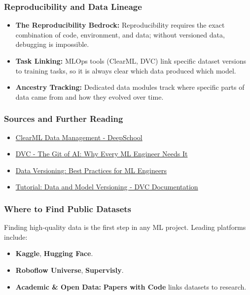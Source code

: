 \documentclass[aspectratio=169]{beamer}
\begin{document}
\begin{frame}[t]
    \frametitle{Reproducibility and Data Lineage}
    \begin{itemize}
        \item \textbf{The Reproducibility Bedrock:} Reproducibility requires the exact combination of code, environment, and data; without versioned data, debugging is impossible.
        \item \textbf{Task Linking:} MLOps tools (ClearML, DVC) link specific dataset versions to training tasks, so it is always clear which data produced which model.
        \item \textbf{Ancestry Tracking:} Dedicated data modules track where specific parts of data came from and how they evolved over time.
    \end{itemize}
\end{frame}

\begin{frame}[t]
    \frametitle{Sources and Further Reading}
    \begin{itemize}
        \item \href{https://blog.deepschool.ru/data/clearml-data-management/}{ClearML Data Management - DeepSchool}
        \item \href{https://aws.plainenglish.io/dvc-the-git-of-ai-why-every-ml-engineer-needs-it-fee2f81f1559}{DVC - The Git of AI: Why Every ML Engineer Needs It}
        \item \href{https://labelyourdata.com/articles/data-versioning-best-practices}{Data Versioning: Best Practices for ML Engineers}
        \item \href{https://dvc.org/doc/use-cases/versioning-data-and-models}{Tutorial: Data and Model Versioning - DVC Documentation}
    \end{itemize}
\end{frame}

\begin{frame}[t]
    \frametitle{Where to Find Public Datasets}
    Finding high-quality data is the first step in any ML project. Leading platforms include:
    \begin{itemize}
        \item \textbf{Kaggle}, \textbf{Hugging Face}.
        \item \textbf{Roboflow Universe}, \textbf{Supervisly}.
        \item \textbf{Academic \& Open Data:} \textbf{Papers with Code} links datasets to research.
    \end{itemize}
\end{frame}
\end{document}
